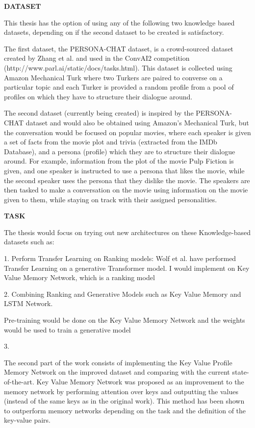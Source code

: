 \documentclass[paper=a4,11pt,parskip=half,toc=listof]{scrartcl}
\begin{document}
	
	\textbf{DATASET}
	
	This thesis has the option of using any of the following two knowledge based datasets, depending on if the second dataset to be created is satisfactory.
	
	The first dataset, the PERSONA-CHAT dataset, is a crowd-sourced dataset created by Zhang et al. \cite{zhang2018personalizing} and used in the ConvAI2 competition (http://www.parl.ai/static/docs/tasks.html). This dataset is collected using Amazon Mechanical Turk where two Turkers are paired to converse on a particular topic and each Turker is provided a random profile from a pool of profiles on which they have to structure their dialogue around.
	
	The second dataset (currently being created) is inspired by the PERSONA-CHAT dataset and would also be obtained using Amazon's Mechanical Turk, but the conversation would be focused on popular movies, where each speaker is given a set of facts from the 	movie plot and trivia (extracted from the IMDb Database), and a persona (profile) which they are to structure their dialogue around. For example, information from the plot of the movie Pulp Fiction is given, and one speaker is instructed	to use a persona that likes the movie, while the second speaker uses the persona that they dislike the movie. The speakers are then tasked to make a conversation on the movie using information on the movie given to them, while staying on track with their assigned personalities.
	
	\textbf{TASK}
	
	The thesis would focus on trying out new architectures on these Knowledge-based datasets such as:

	1. Perform Transfer Learning on Ranking models:
		Wolf et al. have performed Transfer Learning on a generative Transformer model. I would implement on Key Value Memory Network, which is a ranking model
		
	2. Combining Ranking and Generative Models such as Key Value Memory and LSTM Network.
	
	Pre-training would be done on the Key Value Memory Network and the weights would be used to train a generative model 
	
	
	3. 
	
	The second part of the work consists of implementing the Key Value Profile Memory Network \cite{miller2016key} on the improved dataset and comparing with the current state-of-the-art. Key Value Memory Network was proposed as an improvement to the memory network by performing attention over keys and outputting the values (instead of the same keys as in the original work). This method has been shown to outperform memory networks depending on the task and the definition of the key-value pairs.
	
\end{document}
